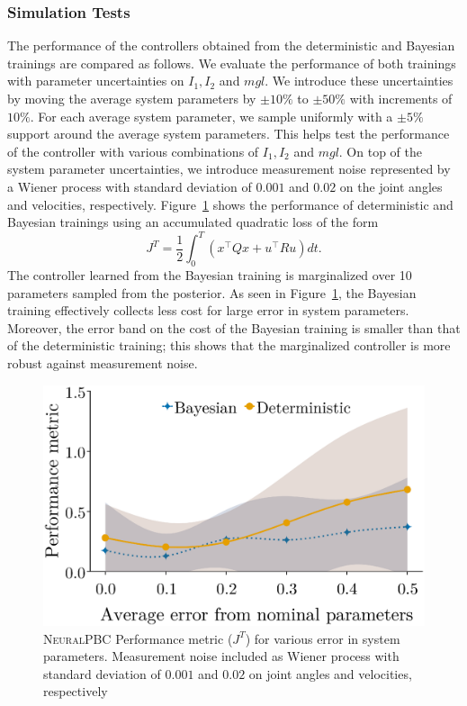 \subsubsection{Simulation Tests} 
The performance of the controllers obtained from the deterministic and Bayesian
trainings are compared as follows.
%
We evaluate the performance of both trainings with parameter uncertainties
on $I_1, I_2$ and $mgl$. 
%
We introduce these uncertainties by moving the average
system parameters by $\pm 10\%$ to $\pm 50\%$ with increments of $10\%$. 
%
For each average system parameter, we sample uniformly with a $\pm 5\%$ support
around the average system parameters. 
%
This helps test the performance of the controller with various combinations of
$I_1, I_2$ and $mgl$.
%
On top of the system parameter uncertainties, we introduce measurement noise
represented by a Wiener process with standard deviation of $0.001$ and $0.02$ on
the joint angles and velocities, respectively. 
%
Figure~\ref{fig:comparison_neuralpbc} shows the performance of deterministic and
Bayesian trainings using an accumulated quadratic loss of the form
\begin{equation} J^T = \frac{1}{2}\int_0^T \left(x^\top Qx + u^\top Ru \right) dt.
\label{eq:performance_metric} \end{equation}
%
The controller learned from the Bayesian training is marginalized over 10
parameters sampled from the posterior.
As seen in Figure~\ref{fig:comparison_neuralpbc}, the Bayesian training
effectively collects less cost for large error in system parameters.
%
Moreover, the error band on the cost of the Bayesian training is smaller than
that of the deterministic training; this shows that the marginalized controller
is more robust against measurement noise.
%   
\begin{figure}
    \centering
    \includegraphics[clip,width=0.7\linewidth]{./figures/bandplot2.eps}%
    \caption{\textsc{NeuralPBC} Performance metric ($J^T$) for various
    error in system parameters. Measurement noise included as Wiener process
    with standard deviation of $0.001$ and $0.02$ on joint angles and
    velocities, respectively}
    \label{fig:comparison_neuralpbc}
\end{figure}

